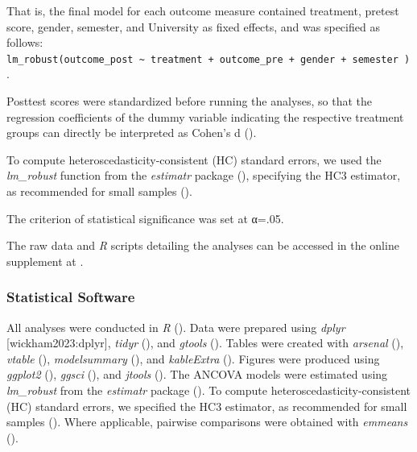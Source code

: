 \documentclass[
  letterpaper,
  DIV=11,
  numbers=noendperiod]{scrartcl}
\begin{document}
That is, the final model for each outcome measure contained treatment,
pretest score, gender, semester, and University as fixed effects, and
was specified as follows:
\texttt{lm\_robust(outcome\_post\ \textasciitilde{}\ treatment\ +\ outcome\_pre\ +\ gender\ +\ semester\ )}.

Posttest scores were standardized before running the analyses, so that
the regression coefficients of the dummy variable indicating the
respective treatment groups can directly be interpreted as Cohen's d
().

To compute heteroscedasticity-consistent (HC) standard errors, we used
the \emph{lm\_robust} function from the \emph{estimatr} package
(), specifying the HC3
estimator, as recommended for small samples ().

The criterion of statistical significance was set at α=.05.

The raw data and \emph{R} scripts detailing the analyses can be accessed
in the online supplement at .

\subsubsection{Statistical Software}\label{statistical-software}

All analyses were conducted in \emph{R} (). Data were prepared using \emph{dplyr}
{[}wickham2023:dplyr{]}, \emph{tidyr}
(), and \emph{gtools}
(). Tables were created
with \emph{arsenal} (),
\emph{vtable} (),
\emph{modelsummary} (), and \emph{kableExtra} ().
Figures were produced using \emph{ggplot2}
(), \emph{ggsci}
(), and \emph{jtools}
(). The ANCOVA models were
estimated using \emph{lm\_robust} from the \emph{estimatr} package
(). To compute
heteroscedasticity-consistent (HC) standard errors, we specified the HC3
estimator, as recommended for small samples (). Where applicable, pairwise comparisons were
obtained with \emph{emmeans} ().
\end{document}
